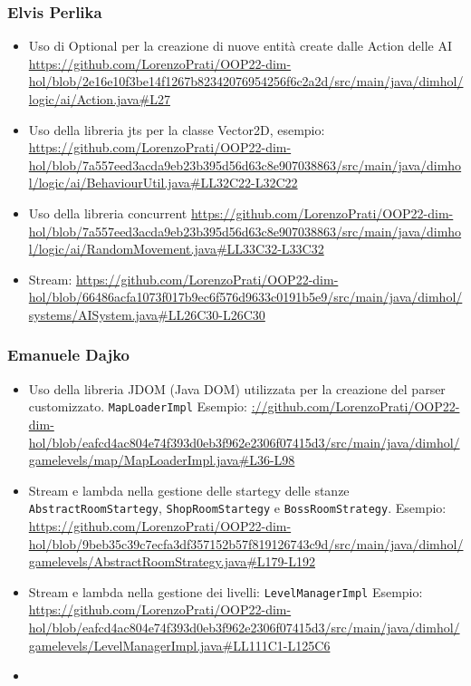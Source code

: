 \documentclass[a4paper,12pt]{report}
\begin{document}
\subsubsection*{Elvis Perlika}
\begin{itemize}
	\item Uso di Optional per la creazione di nuove entità create dalle Action delle AI \url{https://github.com/LorenzoPrati/OOP22-dim-hol/blob/2e16e10f3be14f1267b82342076954256f6c2a2d/src/main/java/dimhol/logic/ai/Action.java#L27}
	
	\item Uso della libreria jts per la classe Vector2D, esempio: \url{https://github.com/LorenzoPrati/OOP22-dim-hol/blob/7a557eed3acda9eb23b395d56d63c8e907038863/src/main/java/dimhol/logic/ai/BehaviourUtil.java#LL32C22-L32C22}

	\item Uso della libreria concurrent \url{https://github.com/LorenzoPrati/OOP22-dim-hol/blob/7a557eed3acda9eb23b395d56d63c8e907038863/src/main/java/dimhol/logic/ai/RandomMovement.java#LL33C32-L33C32}

	\item Stream: \url{https://github.com/LorenzoPrati/OOP22-dim-hol/blob/66486acfa1073f017b9ec6f576d9633c0191b5e9/src/main/java/dimhol/systems/AISystem.java#LL26C30-L26C30}

\end{itemize}

\subsubsection*{Emanuele Dajko}
\begin{itemize}
	\item Uso della libreria JDOM (Java DOM) utilizzata per la creazione del parser customizzato. \texttt{MapLoaderImpl}
	Esempio: \url{://github.com/LorenzoPrati/OOP22-dim-hol/blob/eafcd4ac804e74f393d0eb3f962e2306f07415d3/src/main/java/dimhol/gamelevels/map/MapLoaderImpl.java#L36-L98}

	\item Stream e lambda nella gestione delle startegy delle stanze \texttt{AbstractRoomStartegy}, \texttt{ShopRoomStartegy} e \texttt{BossRoomStrategy}.
	Esempio: \url{https://github.com/LorenzoPrati/OOP22-dim-hol/blob/9beb35c39c7ecfa3df357152b57f819126743c9d/src/main/java/dimhol/gamelevels/AbstractRoomStrategy.java#L179-L192}

	\item Stream e lambda nella gestione dei livelli: \texttt{LevelManagerImpl}
	Esempio: \url{https://github.com/LorenzoPrati/OOP22-dim-hol/blob/eafcd4ac804e74f393d0eb3f962e2306f07415d3/src/main/java/dimhol/gamelevels/LevelManagerImpl.java#LL111C1-L125C6}
	
	\item 
\end{itemize}
\end{document}
